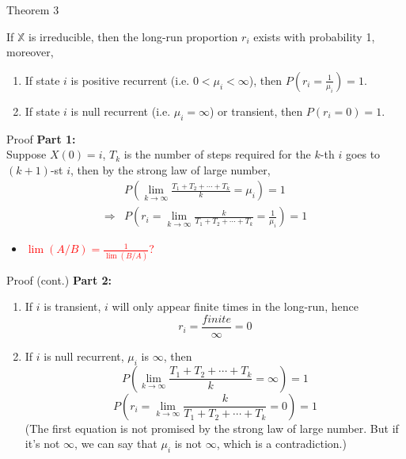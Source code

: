 \documentclass{beamer}
\begin{document}
\begin{frame}{Theorem 3}
	\begin{theorem}
	If $\mathbb{X}$ is irreducible, then the long-run proportion $r_i$ exists with probability 1, moreover,
	\begin{enumerate}
	\item If state $i$ is positive recurrent (i.e. $0 < \mu_i < \infty$), then $P(r_i = \frac{1}{\mu_i}) = 1$.
	\item If state $i$ is null recurrent (i.e. $\mu_i = \infty$) or transient, then $P(r_i = 0) = 1$.
	\end{enumerate}
	\end{theorem}
\end{frame}

\begin{frame}{Proof}
	\textbf{Part 1:} \\
	Suppose $X(0) = i$, $T_k$ is the number of steps required for the $k$-th $i$ goes to $(k+1)$-st $i$,
	then by the strong law of large number,
	\begin{align*}
	&P\left( \lim_{k\to\infty} \frac{T_1 + T_2 + \cdots + T_k}{k} = \mu_i \right) = 1 \\
	\Rightarrow & P\left( r_i = \lim_{k\to\infty} \frac{k}{T_1 + T_2 + \cdots + T_k} = \frac{1}{\mu_i} \right) = 1
	\end{align*}
	\begin{itemize}
	\item \textcolor{red}{$\lim (A/B) = \frac{1}{\lim (B/A)}$?}
	\end{itemize}
\end{frame}

\begin{frame}{Proof (cont.)}
	\textbf{Part 2:} \\
	\begin{enumerate}
	\item If $i$ is transient, $i$ will only appear finite times in the long-run, hence
		\[
		r_i = \frac{finite}{\infty} = 0
		\]
	\item If $i$ is null recurrent, $\mu_i$ is $\infty$, then
		\[
		P\left( \lim_{k\to\infty} \frac{T_1 + T_2 + \cdots + T_k}{k} = \infty \right) = 1
		\]
		\[
		P\left( r_i = \lim_{k\to\infty} \frac{k}{T_1 + T_2 + \cdots + T_k} = 0 \right) = 1
		\]
		(The first equation is not promised by the strong law of large number.
		But if it's not $\infty$, we can say that $\mu_i$ is not $\infty$, which is a contradiction.)
	\end{enumerate}
\end{frame}
\end{document}
